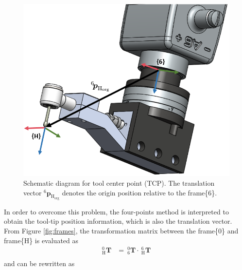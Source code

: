 \begin{figure}[htbp]
\begin{center}
\includegraphics[width=0.7\linewidth]{Images/TCP.png}
\caption{
Schematic diagram for tool center point (TCP). The translation vector $^\mathrm{6}\!\boldsymbol{p}_\mathrm{H_{org}}$ denotes the origin position relative to the frame\{6\}.
}\label{fig:tcp}
\end{center}
\end{figure}
\par
In order to overcome this problem, the four-points method is interpreted to obtain the tool-tip position information, which is also the translation vector. From Figure \ref{fig:frames}, the transformation matrix between the frame\{0\} and frame\{H\} is evaluated as 
\begin{equation}
\begin{split}
_{\mathrm{H}}^{\mathrm{0}}\mathbf{T} &=\ _{\mathrm{6}}^{\mathrm{0}}\mathbf{T}\cdot \ _{\mathrm{H}}^{\mathrm{6}}\mathbf{T}\\
\end{split}
\end{equation}		
and can be rewritten as
